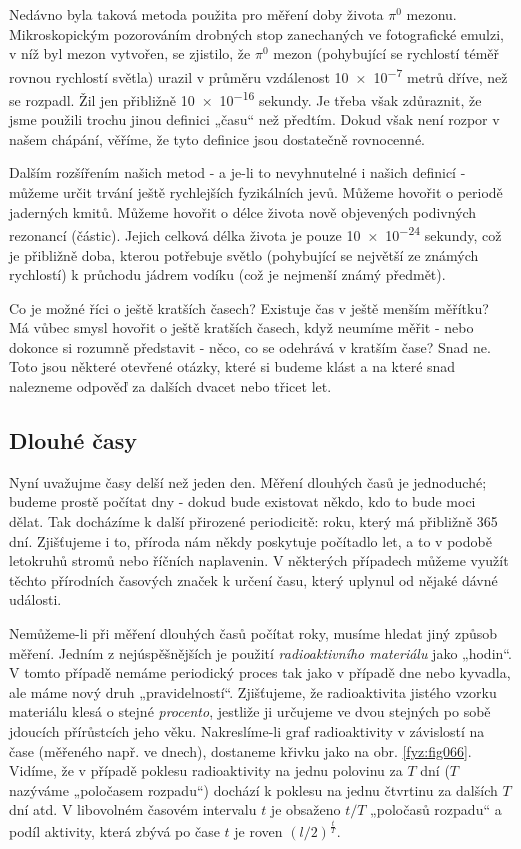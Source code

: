       Nedávno byla taková metoda použita pro měření doby života \(\pi^0\) mezonu. Mikroskopickým
      pozorováním drobných stop zanechaných ve fotografické emulzi, v níž byl mezon vytvořen, se
      zjistilo, že \(\pi^0\) mezon (pohybující se rychlostí téměř rovnou rychlostí světla) urazil v
      průměru vzdálenost \num{10e-7} metrů dříve, než se rozpadl. Žil jen přibližně \num{10e-16}
      sekundy. Je třeba však zdůraznit, že jsme použili trochu jinou definici „času“ než předtím.
      Dokud však není rozpor v našem chápání, věříme, že tyto definice jsou dostatečně rovnocenné.
      
      Dalším rozšířením našich metod - a je-li to nevyhnutelné i našich definicí - můžeme určit
      trvání ještě rychlejších fyzikálních jevů. Můžeme hovořit o periodě jaderných kmitů. Můžeme
      hovořit o délce života nově objevených podivných rezonancí (částic). Jejich celková délka
      života je pouze \num{10e-24} sekundy, což je přibližně doba, kterou potřebuje světlo
      (pohybující se největší ze známých rychlostí) k průchodu jádrem vodíku (což je nejmenší známý
      předmět).
      
      Co je možné říci o ještě kratších časech? Existuje čas v ještě menším měřítku? Má vůbec smysl
      hovořit o ještě kratších časech, když neumíme měřit - nebo dokonce si rozumně představit -
      něco, co se odehrává v kratším čase? Snad ne. Toto jsou některé otevřené otázky, které si
      budeme klást a na které snad nalezneme odpověď za dalších dvacet nebo třicet let.
    
    \subsection{Dlouhé časy}
      Nyní uvažujme časy delší než jeden den. Měření dlouhých časů je jednoduché; budeme prostě
      počítat dny - dokud bude existovat někdo, kdo to bude moci dělat. Tak docházíme k další
      přirozené periodicitě: roku, který má přibližně \num{365} dní. Zjišťujeme i to, příroda nám
      někdy poskytuje počítadlo let, a to v podobě letokruhů stromů nebo říčních naplavenin. V
      některých případech můžeme využít těchto přírodních časových značek k určení času, který
      uplynul od nějaké dávné události.
      
      Nemůžeme-li při měření dlouhých časů počítat roky, musíme hledat jiný způsob měření. Jedním z
      nejúspěšnějších je použití \emph{radioaktivního materiálu} jako „hodin“. V tomto případě
      nemáme periodický proces tak jako v případě dne nebo kyvadla, ale máme nový druh
      „pravidelností“. Zjišťujeme, že radioaktivita jistého vzorku materiálu klesá o stejné
      \emph{procento},    
      jestliže ji určujeme ve dvou stejných po sobě jdoucích přírůstcích jeho věku. Nakreslíme-li
      graf radioaktivity v závislostí na čase (měřeného např. ve dnech), dostaneme křivku jako na
      obr. \ref{fyz:fig066}. Vidíme, že v případě poklesu radioaktivity na jednu polovinu za \(T\)
      dní (\(T\) nazýváme „poločasem rozpadu“) dochází k poklesu na jednu čtvrtinu za dalších \(T\)
      dní atd. V libovolném časovém intervalu \(t\) je obsaženo \(t/T\) „poločasů rozpadu“ a podíl
      aktivity, která zbývá po čase \(t\) je roven \((l/2)^{\frac{t}{T}}\).

